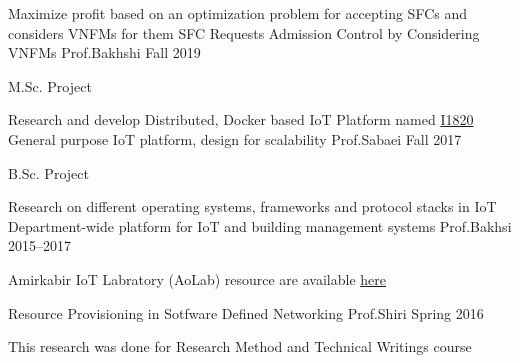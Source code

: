 
\begin{cventries}

  \cventry%
    {Maximize profit based on an optimization problem for accepting SFCs and considers VNFMs for them} %
    {SFC Requests Admission Control by Considering VNFMs} %
    {Prof.Bakhshi} %
    {Fall 2019} %
    {%
      \begin{cvitems} %
        \item {M.Sc. Project}
      \end{cvitems}
    }

  \cventry%
    {Research and develop Distributed, Docker based IoT Platform named \href{https://github.com/I1820}{I1820}} %
    {General purpose IoT platform, design for scalability} %
    {Prof.Sabaei} %
    {Fall 2017} %
    {%
      \begin{cvitems} %
        \item {B.Sc. Project}
      \end{cvitems}
    }

  \cventry%
    {Research on different operating systems, frameworks and protocol stacks in IoT} %
    {Department-wide platform for IoT and building management systems} %
    {Prof.Bakhsi} %
    {2015--2017} %
    {%
      \begin{cvitems} %
        \item {Amirkabir IoT Labratory (AoLab) resource are available \href{https://aolab.github.io/}{here}}
      \end{cvitems}
    }

  \cventry%
    {} %
    {Resource Provisioning in Sotfware Defined Networking} %
    {Prof.Shiri} %
    {Spring 2016} %
    {%
      \begin{cvitems} %
        \item {This research was done for Research Method and Technical Writings course}
      \end{cvitems}
    }

\end{cventries}
